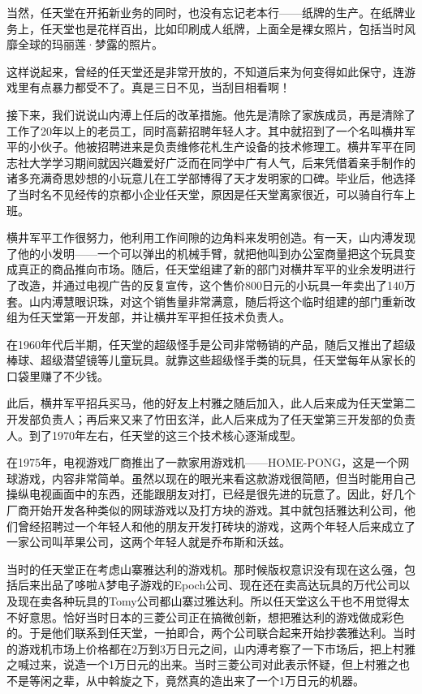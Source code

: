 \documentclass[
  letterpaper,
  DIV=11,
  numbers=noendperiod]{scrreprt}
\begin{document}
当然，任天堂在开拓新业务的同时，也没有忘记老本行------纸牌的生产。在纸牌业务上，任天堂也是花样百出，比如印刷成人纸牌，上面全是裸女照片，包括当时风靡全球的玛丽莲·梦露的照片。

这样说起来，曾经的任天堂还是非常开放的，不知道后来为何变得如此保守，连游戏里有点暴力都受不了。真是三日不见，当刮目相看啊！

接下来，我们说说山内溥上任后的改革措施。他先是清除了家族成员，再是清除了工作了20年以上的老员工，同时高薪招聘年轻人才。其中就招到了一个名叫横井军平的小伙子。他被招聘进来是负责维修花札生产设备的技术修理工。横井军平在同志社大学学习期间就因兴趣爱好广泛而在同学中广有人气，后来凭借着亲手制作的诸多充满奇思妙想的小玩意儿在工学部博得了天才发明家的口碑。毕业后，他选择了当时名不见经传的京都小企业任天堂，原因是任天堂离家很近，可以骑自行车上班。

横井军平工作很努力，他利用工作间隙的边角料来发明创造。有一天，山内溥发现了他的小发明------一个可以弹出的机械手臂，就把他叫到办公室商量把这个玩具变成真正的商品推向市场。随后，任天堂组建了新的部门对横井军平的业余发明进行了改造，并通过电视广告的反复宣传，这个售价800日元的小玩具一年卖出了140万套。山内溥慧眼识珠，对这个销售量非常满意，随后将这个临时组建的部门重新改组为任天堂第一开发部，并让横井军平担任技术负责人。

在1960年代后半期，任天堂的超级怪手是公司非常畅销的产品，随后又推出了超级棒球、超级潜望镜等儿童玩具。就靠这些超级怪手类的玩具，任天堂每年从家长的口袋里赚了不少钱。

此后，横井军平招兵买马，他的好友上村雅之随后加入，此人后来成为任天堂第二开发部负责人；再后来又来了竹田玄洋，此人后来成为了任天堂第三开发部的负责人。到了1970年左右，任天堂的这三个技术核心逐渐成型。

在1975年，电视游戏厂商推出了一款家用游戏机------HOME-PONG，这是一个网球游戏，内容非常简单。虽然以现在的眼光来看这款游戏很简陋，但当时能用自己操纵电视画面中的东西，还能跟朋友对打，已经是很先进的玩意了。因此，好几个厂商开始开发各种类似的网球游戏以及打方块的游戏。其中就包括雅达利公司，他们曾经招聘过一个年轻人和他的朋友开发打砖块的游戏，这两个年轻人后来成立了一家公司叫苹果公司，这两个年轻人就是乔布斯和沃兹。

当时的任天堂正在考虑山寨雅达利的游戏机。那时候版权意识没有现在这么强，包括后来出品了哆啦A梦电子游戏的Epoch公司、现在还在卖高达玩具的万代公司以及现在卖各种玩具的Tomy公司都山寨过雅达利。所以任天堂这么干也不用觉得太不好意思。恰好当时日本的三菱公司正在搞微创新，想把雅达利的游戏做成彩色的。于是他们联系到任天堂，一拍即合，两个公司联合起来开始抄袭雅达利。当时的游戏机市场上价格都在2万到3万日元之间，山内溥考察了一下市场后，把上村雅之喊过来，说造一个1万日元的出来。当时三菱公司对此表示怀疑，但上村雅之也不是等闲之辈，从中斡旋之下，竟然真的造出来了一个1万日元的机器。
\end{document}
